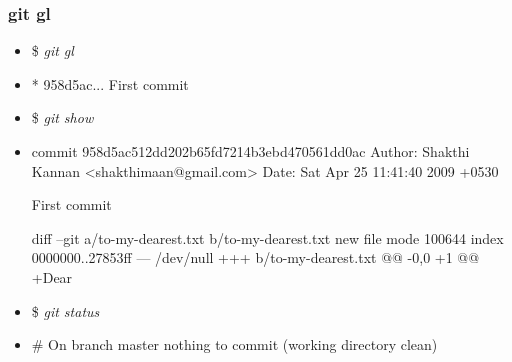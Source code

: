 \documentclass[10pt]{beamer}
\newcommand{\command}[1]{\textsl{\textit{#1}}}
\newcommand{\twoactor}{raaani-mukerji}
\begin{document}
%
%

\begin{frame}[fragile]
\frametitle{git gl}

\begin{block}{}
\scriptsize
\begin{semiverbatim}
\begin{itemize}[<+-| alert@+>]
\item[]{\$ \command{git gl}}
\item[]{* 958d5ac... First commit}

\item[]{\$ \command{git show}}
\item[]{commit 958d5ac512dd202b65fd7214b3ebd470561dd0ac
Author: Shakthi Kannan <shakthimaan@gmail.com>
Date:   Sat Apr 25 11:41:40 2009 +0530

    First commit

diff --git a/to-my-dearest.txt b/to-my-dearest.txt
new file mode 100644
index 0000000..27853ff
 --- /dev/null
 +++ b/to-my-dearest.txt
@@ -0,0 +1 @@
+Dear}

\item[]{\$ \command{git status}}
\item[]{# On branch master
nothing to commit (working directory clean)}
\end{itemize}
\end{semiverbatim}
\end{block}

\end{frame}

%
%
\end{document}
